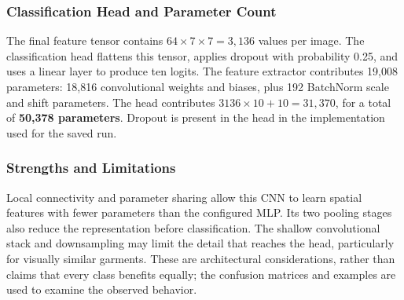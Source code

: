 \subsubsection{Classification Head and Parameter Count}

The final feature tensor contains $64\times7\times7=3{,}136$ values per image. The classification head flattens this tensor, applies dropout with probability 0.25, and uses a linear layer to produce ten logits. The feature extractor contributes 19,008 parameters: 18,816 convolutional weights and biases, plus 192 BatchNorm scale and shift parameters. The head contributes $3136\times10+10=31{,}370$, for a total of \textbf{50,378 parameters}. Dropout is present in the head in the implementation used for the saved run.

\subsubsection{Strengths and Limitations}

Local connectivity and parameter sharing allow this CNN to learn spatial features with fewer parameters than the configured MLP. Its two pooling stages also reduce the representation before classification. The shallow convolutional stack and downsampling may limit the detail that reaches the head, particularly for visually similar garments. These are architectural considerations, rather than claims that every class benefits equally; the confusion matrices and examples are used to examine the observed behavior.
